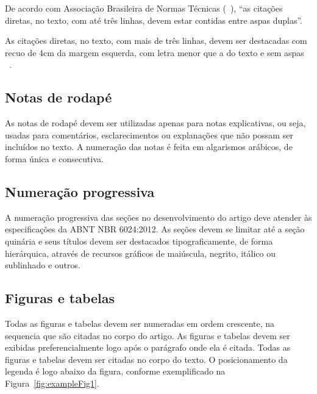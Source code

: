 \documentclass[article,a4paper,12pt,brazil,sumario=tradicional]{abntex2}
\renewenvironment{quotation}
  {\small\list{}{\rightmargin=0cm \leftmargin=2cm}%
   \item\relax}
  {\endlist}
\begin{document}
De acordo com Associação Brasileira de Normas Técnicas (~\citeyear{bibliografica6023}), ``as citações diretas, no texto, com até três linhas, devem estar contidas entre aspas duplas''.

\begin{quotation}
\noindent
As citações diretas, no texto, com mais de três linhas, devem ser destacadas com recuo de 4cm da margem esquerda, com letra menor que a do texto e sem aspas ~\cite{bibliografica6023}.
\end{quotation}

\subsection{Notas de rodapé}

As notas de rodapé devem ser utilizadas apenas para notas explicativas, ou seja, usadas para comentários, esclarecimentos ou explanações que não possam ser incluídos no texto. A numeração das notas é feita em algarismos arábicos, de forma única e consecutiva.

\subsection{Numeração progressiva}

A numeração progressiva das seções no desenvolvimento do artigo deve atender às especificações da ABNT NBR 6024:2012. As seções devem se limitar até a seção quinária e seus títulos devem ser destacados tipograficamente, de forma hierárquica, através de recursos gráficos de maiúscula, negrito, itálico ou sublinhado e outros.

\subsection{Figuras e tabelas}

Todas as figuras e tabelas devem ser numeradas em ordem crescente, na sequencia que são citadas no corpo do artigo. As figuras e tabelas devem ser exibidas preferencialmente logo após o parágrafo onde ela é citada. Todas as figuras e tabelas devem ser citadas no corpo do texto. O posicionamento da legenda é logo abaixo da figura, conforme exemplificado na Figura~\ref{fig:exampleFig1}.
\end{document}
